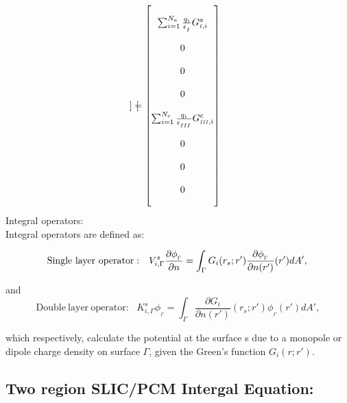\documentclass{article}
\newcommand{\RomCap}[1]
    {\MakeUppercase{\scaleto{\romannumeral #1}{3.5pt}}}
\begin{document}
\begin{equation}
\begin{bmatrix}
	    \end{bmatrix} = \begin{bmatrix}
	    \\
	    \sum_{i=1}^{N_a}\frac{q_i}{\epsilon_{_\RomCap{1}}}G_{\RomCap{1},i}^{a} \\ \\
	    0 \\ \\
	    0 \\ \\
	    0 \\ \\
	    \sum_{i=1}^{N_c}\frac{q_i}{\epsilon_{_\RomCap{3}}}G_{\RomCap{3},i}^{c} \\ \\
	    0 \\ \\
	    0 \\ \\
	    0 \\ \\

	    \end{bmatrix}
	\end{equation}
	Integral operators:\\
	
	Integral operators are defined as:

	\begin{equation}
	\mathrm{Single \ layer \ operator:} \ \ \ V^{s}_{i,\Gamma} \frac{\partial\phi_{_\Gamma}}{\partial{n}}= \int_{\Gamma}G_{i}(r_s;r')\frac{\partial\phi_{_\Gamma}}{\partial{n(r')}}(r')dA',\\
	\end{equation}

	and \\

	\begin{equation}
	\mathrm{Double \ layer \ operator:} \ \ \ K^{s}_{i,\Gamma} \phi_{_\Gamma}= \int_{\Gamma}\frac{\partial G_i}{\partial{n(r')}}(r_s;r')\phi_{_\Gamma}(r')dA',
	\end{equation}

	which respectively, calculate the potential at the surface s due to a monopole or dipole charge density on surface $\Gamma$, given the Green's function $G_i(r;r')$.




\subsection{Two region SLIC/PCM Intergal Equation:}
\end{document}

